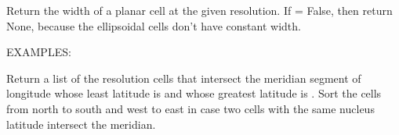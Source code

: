 \documentclass[a4paper,12ptopenany,oneside,english]{sphinxmanual}
\begin{document}
\begin{fulllineitems}

\begin{fulllineitems}
\label{\detokenize{dggs:rhealpixdggs.dggs.RHEALPixDGGS.cell_width}}
\pysigstartsignatures
\pysiglinewithargsret
{}
{\sphinxparamcomma {}}
{}
\pysigstopsignatures
\sphinxAtStartPar
Return the width of a planar cell at the given resolution.
If  = False, then return None,
because the ellipsoidal cells don’t have constant width.

\sphinxAtStartPar
EXAMPLES:

\begin{sphinxVerbatim}[commandchars=\\\{\}]
  
  
  
\end{sphinxVerbatim}

\end{fulllineitems}


\begin{fulllineitems}
\label{\detokenize{dggs:rhealpixdggs.dggs.RHEALPixDGGS.cells_from_meridian}}
\pysigstartsignatures
\pysiglinewithargsret
{}
{\sphinxparamcomma {}\sphinxparamcomma {}\sphinxparamcomma {}}
{}
\pysigstopsignatures
\sphinxAtStartPar
Return a list of the resolution  cells that intersect
the meridian segment of longitude  whose least latitude is
 and whose greatest latitude is .
Sort the cells from north to south and west to east in case
two cells with the same nucleus latitude intersect the
meridian.


\end{fulllineitems}
\end{fulllineitems}
\end{document}

